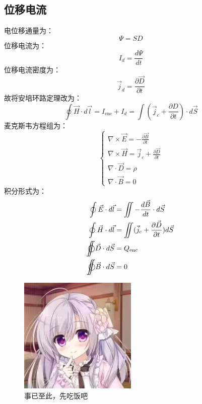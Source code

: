 \documentclass{ctexart}
\def\ooint{{\bigcirc}\kern-12.5pt{\int}\kern-7.5pt{\int}}
\begin{document}
\subsection{位移电流}
电位移通量为：
$$
    \varPsi = SD
$$
位移电流为：
$$
    I_d = \frac{d\varPsi}{dt}
$$
位移电流密度为：
$$
    \vec{j}_d =  \frac{\partial \vec{D}}{\partial t}
$$
故将安培环路定理改为：
$$
    \oint \vec{H} \cdot d\vec{l} = I_{\text{enc}} + I_d = \int (\vec{j}_c + \frac{\partial D}{\partial t} )\cdot d\vec{S}
$$
麦克斯韦方程组为：
\begin{equation*}
    \begin{cases}
        \nabla \times \vec{E} = -\frac{\partial \vec{B}}{\partial t} \\
        \nabla \times \vec{H} = \vec{j}_c + \frac{\partial \vec{D}}{\partial t} \\
        \nabla \cdot \vec{D} = \rho \\
        \nabla \cdot \vec{B} = 0
    \end{cases}
\end{equation*}
积分形式为：
\begin{align*}
    \oint \vec{E} \cdot d\vec{l} &=  \iint -\frac{d \vec{B}}{dt}  \cdot d\vec{S} \\
    \oint \vec{H} \cdot d\vec{l} &= \iint (\vec{j}_c  + \frac{\partial \vec{D}}{\partial t}) d\vec{S} \\
    \ooint \vec{D} \cdot d\vec{S} &= Q_{\text{enc}} \\
    \ooint \vec{B} \cdot d\vec{S} &= 0
\end{align*}
\begin{figure}[H]
    \centering
    \includegraphics[width=0.5\textwidth]{img/source.jpg}
    \caption{事已至此，先吃饭吧}
\end{figure}
\end{document}
